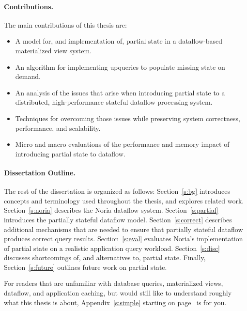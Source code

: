 


\paragraph{Contributions.}

The main contributions of this thesis are:

\begin{itemize}
 \item A model for, and implementation of, partial state in a dataflow-based
   materialized view system.
 \item An algorithm for implementing upqueries to populate missing state on
   demand.
 \item An analysis of the issues that arise when introducing partial state to a
   distributed, high-performance stateful dataflow processing system.
 \item Techniques for overcoming those issues while preserving system
	 correctness, performance, and scalability.
 \item Micro and macro evaluations of the performance and memory impact of
	 introducing partial state to dataflow.
\end{itemize}

\paragraph{Dissertation Outline.}

The rest of the dissertation is organized as follows: Section~\ref{s:bg}
introduces concepts and terminology used throughout the thesis, and explores
related work. Section~\ref{s:noria} describes the Noria dataflow system.
Section~\ref{s:partial} introduces the partially stateful dataflow model.
Section~\ref{s:correct} describes additional mechanisms that are needed to
ensure that partially stateful dataflow produces correct query results.
Section~\ref{s:eval} evaluates Noria's implementation of partial state on a
realistic application query workload. Section~\ref{s:disc} discusses
shortcomings of, and alternatives to, partial state. Finally,
Section~\ref{s:future} outlines future work on partial state.

For readers that are unfamiliar with database queries, materialized views,
dataflow, and application caching, but would still like to understand roughly
what this thesis is about, Appendix~\ref{s:simple} starting on
page~\pageref{s:simple} is for you.
